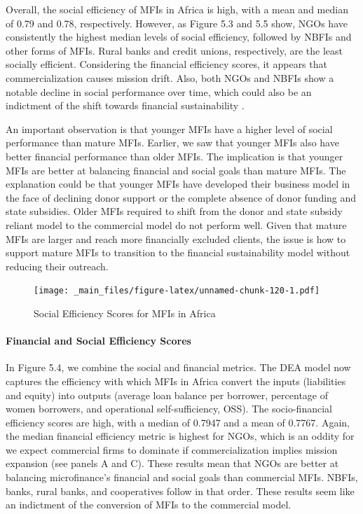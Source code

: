 \documentclass[a4paper, nobind]{templates/ociamthesis}
\begin{document}
Overall, the social efficiency of MFIs in Africa is high, with a mean and median of 0.79 and 0.78, respectively. However, as Figure 5.3 and 5.5 show, NGOs have consistently the highest median levels of social efficiency, followed by NBFIs and other forms of MFIs. Rural banks and credit unions, respectively, are the least socially efficient. Considering the financial efficiency scores, it appears that commercialization causes mission drift. Also, both NGOs and NBFIs show a notable decline in social performance over time, which could also be an indictment of the shift towards financial sustainability \autocite{d2017ngos}.

An important observation is that younger MFIs have a higher level of social performance than mature MFIs. Earlier, we saw that younger MFIs also have better financial performance than older MFIs. The implication is that younger MFIs are better at balancing financial and social goals than mature MFIs. The explanation could be that younger MFIs have developed their business model in the face of declining donor support or the complete absence of donor funding and state subsidies. Older MFIs required to shift from the donor and state subsidy reliant model to the commercial model do not perform well. Given that mature MFIs are larger and reach more financially excluded clients, the issue is how to support mature MFIs to transition to the financial sustainability model without reducing their outreach.

\begin{landscape}

\begin{figure}
\centering
\texttt{[image: \_main\_files/figure-latex/unnamed-chunk-120-1.pdf]}
\caption{\label{fig:unnamed-chunk-120}Social Efficiency Scores for MFIs in Africa}
\end{figure}

\end{landscape}

\hypertarget{financial-and-social-efficiency-scores}{%
\paragraph{Financial and Social Efficiency Scores}\label{financial-and-social-efficiency-scores}}

In Figure 5.4, we combine the social and financial metrics. The DEA model now captures the efficiency with which MFIs in Africa convert the inputs (liabilities and equity) into outputs (average loan balance per borrower, percentage of women borrowers, and operational self-sufficiency, OSS). The socio-financial efficiency scores are high, with a median of 0.7947 and a mean of 0.7767. Again, the median financial efficiency metric is highest for NGOs, which is an oddity for we expect commercial firms to dominate if commercialization implies mission expansion (see panels A and C). These results mean that NGOs are better at balancing microfinance's financial and social goals than commercial MFIs. NBFIs, banks, rural banks, and cooperatives follow in that order. These results seem like an indictment of the conversion of MFIs to the commercial model.
\end{document}
